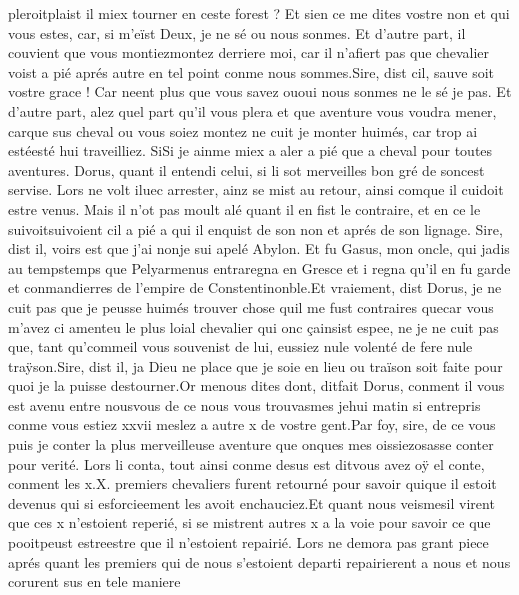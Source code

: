 \documentclass{article}
\begin{document}
\begin{pages}
      pleroitplaist il 
      miex tourner en ceste forest ? Et sien ce me dites vostre non et 
      qui vous estes, car, si m’eïst Deux, je ne sé ou nous sonmes. Et d’autre part, il couvient que vous 
      montiezmontez derriere moi, 
   car il n’afiert pas que chevalier voist a pié aprés autre en tel point conme nous sommes.Sire, dist cil, sauve soit vostre grace ! Car neent plus que vous savez 
      ououi nous sonmes ne 
      le sé je pas. Et d’autre part, alez quel part qu’il vous plera et que 
      aventure vous voudra mener, carque sus cheval ou vous soiez montez ne 
      cuit je monter huimés, car trop ai estéesté hui traveilliez. 
      SiSi je ainme miex a aler a pié que a cheval pour toutes aventures. \pend
\pstart Dorus, quant il entendi celui, si li sot merveilles bon gré de 
   soncest servise. Lors ne volt iluec arrester, ainz se mist au retour, 
   ainsi comque il cuidoit estre venus. Mais il n’ot pas moult alé quant il en fist le contraire, et en ce le 
   suivoitsuivoient cil a pié a qui il enquist de son non et aprés de son 
   lignage.
   Sire, dist il, voirs est que j’ai nonje sui apelé 
      Abylon. Et fu Gasus, mon oncle, qui jadis au 
      tempstemps que Pelyarmenus 
      entraregna en Gresce 
      et i regna qu’il en fu garde et conmandierres de l’empire de 
   Constentinonble.Et vraiement, dist Dorus, je ne cuit pas que je peusse huimés 
      trouver chose quil me fust contraires quecar vous m’avez ci amenteu 
      le plus loial chevalier qui onc çainsist espee, ne je ne cuit pas que, tant 
      qu’commeil vous souvenist de lui, eussiez nule volenté de fere nule 
      traÿson.Sire, dist il, ja Dieu ne place que je soie en lieu ou traïson soit faite 
      pour quoi je la puisse destourner.Or menous dites dont, 
      ditfait Dorus, conment il vous est 
      avenu entre nousvous de ce nous vous trouvasmes jehui 
      matin si entrepris conme vous estiez xxvii meslez a autre 
      x de vostre gent.Par foy, sire, de ce vous puis je conter la plus merveilleuse aventure que onques mes 
      oissiezosasse conter pour verité.
   Lors li conta, tout ainsi conme desus est ditvous avez oÿ el conte, 
   conment les x.X. premiers 
      chevaliers furent retourné pour savoir quique il estoit devenus qui si 
      esforcieement les avoit enchauciez.Et quant nous veismesil virent que ces 
      x n’estoient reperié, si se mistrent autres x a la voie 
      pour savoir ce que pooitpeust 
      estreestre que il n'estoient repairié. Lors ne demora pas grant piece
      aprés quant les premiers qui de nous s'estoient departi repairierent a nous et nous corurent sus en tele maniere 

\end{pages}
\end{document}
